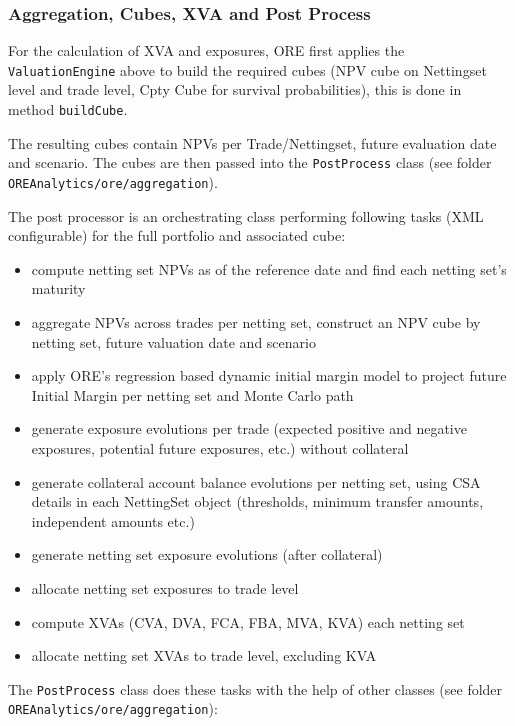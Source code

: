 \documentclass[12pt, a4paper]{report}
\begin{document}
\subsubsection{Aggregation, Cubes, XVA and Post Process}
For the calculation of XVA and exposures, ORE first applies the {\tt ValuationEngine} above to build the required cubes (NPV cube on Nettingset level and trade level, Cpty Cube for survival probabilities), this is done in method {\tt buildCube}.

The resulting cubes contain NPVs per Trade/Nettingset, future evaluation date and scenario. The cubes are then passed into the {\tt PostProcess} class (see folder {\tt OREAnalytics/ore/aggregation}).

The post processor is an orchestrating class performing following tasks (XML configurable) for the full portfolio and associated cube:
\begin{itemize}
\item compute netting set NPVs as of the reference date and find each netting set's maturity
\item aggregate NPVs across trades per netting set, construct an NPV cube by netting set, future valuation date and scenario
\item apply ORE's regression based dynamic initial margin model to project future Initial Margin per netting set and Monte Carlo path
\item generate exposure evolutions per trade (expected positive and negative exposures, potential future exposures, etc.) without collateral
\item generate collateral account balance evolutions per netting set, using CSA details in each NettingSet object (thresholds, minimum transfer amounts, independent amounts etc.)
\item generate netting set exposure evolutions (after collateral)
\item allocate netting set exposures to trade level
\item compute XVAs (CVA, DVA, FCA, FBA, MVA, KVA) each netting set
\item allocate netting set XVAs to trade level, excluding KVA
\end{itemize}

The {\tt PostProcess} class does these tasks with the help of other classes (see folder {\tt OREAnalytics/ore/aggregation}):
\end{document}

